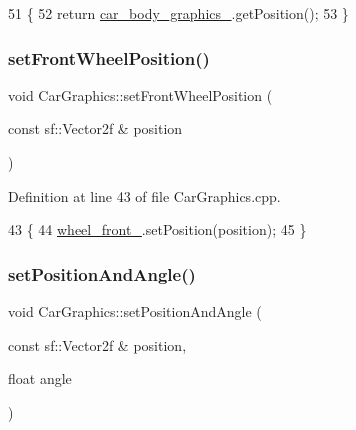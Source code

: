 \begin{DoxyCode}
51                                                  \{
52     \textcolor{keywordflow}{return} \hyperlink{classCarGraphics_a4e1969ef5f4326f10b83b1488484f660}{car\_body\_graphics\_}.getPosition();
53 \}
\end{DoxyCode}
\mbox{\label{classCarGraphics_a02169a6fec9b7d4c076b5597a11eac08}} 
\subsubsection{\texorpdfstring{set\+Front\+Wheel\+Position()}{setFrontWheelPosition()}}
{\footnotesize\ttfamily void Car\+Graphics\+::set\+Front\+Wheel\+Position (\begin{DoxyParamCaption}\item[{const sf\+::\+Vector2f \&}]{position }\end{DoxyParamCaption})}



Definition at line 43 of file Car\+Graphics.\+cpp.


\begin{DoxyCode}
43                                                                   \{
44     \hyperlink{classCarGraphics_a2e004e7f0288f6ed1352ba9116b4d112}{wheel\_front\_}.setPosition(position);
45 \}
\end{DoxyCode}
\mbox{\label{classCarGraphics_a66e55f3ba283beb484eb8285c40bda14}} 
\subsubsection{\texorpdfstring{set\+Position\+And\+Angle()}{setPositionAndAngle()}}
{\footnotesize\ttfamily void Car\+Graphics\+::set\+Position\+And\+Angle (\begin{DoxyParamCaption}\item[{const sf\+::\+Vector2f \&}]{position,  }\item[{float}]{angle }\end{DoxyParamCaption})}



